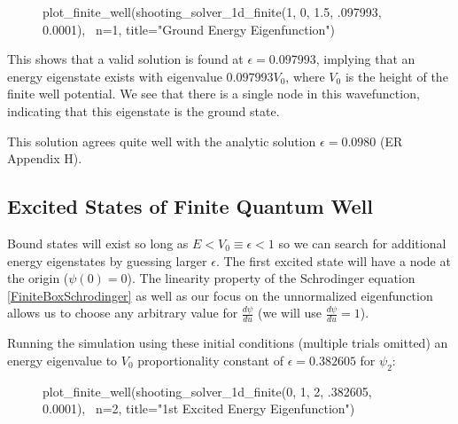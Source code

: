 \documentclass{article}
\begin{document}
\vspace{-.2in}
\begin{figure}[H]
\begin{sageblock}
plot_finite_well(shooting_solver_1d_finite(1, 0, 1.5, .097993, 0.0001), \
                      n=1, title="Ground Energy Eigenfunction")
\end{sageblock}
\vspace{-.1in}
\centering
{}
\end{figure}

This shows that a valid solution is found at $\epsilon = 0.097993$, implying
that an energy eigenstate exists with eigenvalue $0.097993V_0$, where $V_0$ is
the height of the finite well potential. We see that there is a single node in
this wavefunction, indicating that this eigenstate is the ground state.

This solution agrees quite well with the analytic solution $\epsilon = 0.0980$
(ER Appendix H).

\subsection{Excited States of Finite Quantum Well}

Bound states will exist so long as $E < V_0 \equiv \epsilon < 1$ so we can
search for additional energy eigenstates by guessing larger $\epsilon$. The
first excited state will have a node at the origin ($\psi(0) = 0$). The
linearity property of the Schrodinger equation \eqref{FiniteBoxSchrodinger} as
well as our focus on the unnormalized eigenfunction allows us to choose any
arbitrary value for $\frac{d\psi}{du}$ (we will use $\frac{d\psi}{du}=1$).

Running the simulation using these initial conditions (multiple trials omitted)
an energy eigenvalue to $V_0$ proportionality constant of $\epsilon = 0.382605$
for $\psi_2$:

\begin{figure}[H]
\begin{sageblock}
plot_finite_well(shooting_solver_1d_finite(0, 1, 2, .382605, 0.0001), \
                      n=2, title="1st Excited Energy Eigenfunction")
\end{sageblock}
\vspace{-.1in}
\centering
{}
\end{figure}
\end{document}

